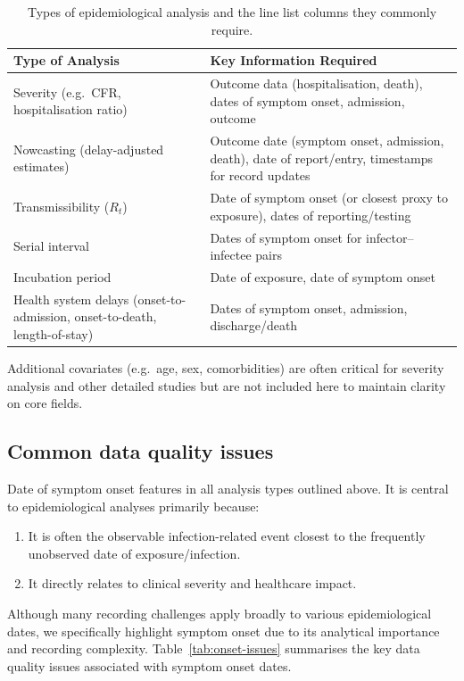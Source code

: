 \documentclass[11pt,a4paper]{article}
\begin{document}
\begin{table}[ht]
  \centering
  \caption{Types of epidemiological analysis and the line list columns they commonly require.}
  \label{tab:analysis-types}
  \begin{tabular}{p{4.5cm} p{9.5cm}}
    \toprule
    Type of Analysis & Key Information Required \\
    \midrule
    Severity (e.g.\ CFR, hospitalisation ratio)
      & Outcome data (hospitalisation, death), dates of symptom onset, admission, outcome \\
    Nowcasting (delay-adjusted estimates)
      & Outcome date (symptom onset, admission, death), date of report/entry, timestamps for record updates \\
    Transmissibility ($R_t$)
      & Date of symptom onset (or closest proxy to exposure), dates of reporting/testing \\
    Serial interval
      & Dates of symptom onset for infector--infectee pairs \\
    Incubation period
      & Date of exposure, date of symptom onset \\
    Health system delays (onset-to-admission, onset-to-death, length-of-stay)
      & Dates of symptom onset, admission, discharge/death \\
    \bottomrule
  \end{tabular}
\end{table}

Additional covariates (e.g.\ age, sex, comorbidities) are often critical for severity analysis and other detailed studies but are not included here to maintain clarity on core fields.

\subsection{Common data quality issues}

Date of symptom onset features in all analysis types outlined above.
It is central to epidemiological analyses primarily because:
\begin{enumerate}
  \item It is often the observable infection-related event closest to the frequently unobserved date of exposure/infection.
  \item It directly relates to clinical severity and healthcare impact.
\end{enumerate}

Although many recording challenges apply broadly to various epidemiological dates, we specifically highlight symptom onset due to its analytical importance and recording complexity.
Table~\ref{tab:onset-issues} summarises the key data quality issues associated with symptom onset dates.
\end{document}
